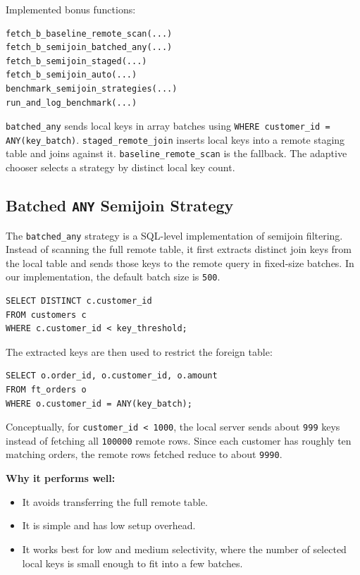 \documentclass[10pt,a4paper]{article}
\begin{document}
Implemented bonus functions:

\begin{lstlisting}[style=sqlstyle]
fetch_b_baseline_remote_scan(...)
fetch_b_semijoin_batched_any(...)
fetch_b_semijoin_staged(...)
fetch_b_semijoin_auto(...)
benchmark_semijoin_strategies(...)
run_and_log_benchmark(...)
\end{lstlisting}

\texttt{batched\_any} sends local keys in array batches using \texttt{WHERE customer\_id = ANY(key\_batch)}. \texttt{staged\_remote\_join} inserts local keys into a remote staging table and joins against it. \texttt{baseline\_remote\_scan} is the fallback. The adaptive chooser selects a strategy by distinct local key count.

\subsection{Batched \texttt{ANY} Semijoin Strategy}

The \texttt{batched\_any} strategy is a SQL-level implementation of semijoin filtering. Instead of scanning the full remote table, it first extracts distinct join keys from the local table and sends those keys to the remote query in fixed-size batches. In our implementation, the default batch size is \texttt{500}.

\begin{lstlisting}[style=sqlstyle]
SELECT DISTINCT c.customer_id
FROM customers c
WHERE c.customer_id < key_threshold;
\end{lstlisting}

The extracted keys are then used to restrict the foreign table:

\begin{lstlisting}[style=sqlstyle]
SELECT o.order_id, o.customer_id, o.amount
FROM ft_orders o
WHERE o.customer_id = ANY(key_batch);
\end{lstlisting}

Conceptually, for \texttt{customer\_id < 1000}, the local server sends about \texttt{999} keys instead of fetching all \texttt{100000} remote rows. Since each customer has roughly ten matching orders, the remote rows fetched reduce to about \texttt{9990}.

\textbf{Why it performs well:}

\begin{itemize}
    \item It avoids transferring the full remote table.
    \item It is simple and has low setup overhead.
    \item It works best for low and medium selectivity, where the number of selected local keys is small enough to fit into a few batches.
\end{itemize}
\end{document}
